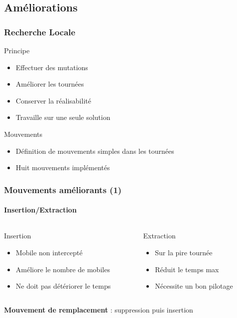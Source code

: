 \subsection{Améliorations}
\begin{frame}
	\frametitle{Recherche Locale}
	\begin{block}{Principe}
		\begin{itemize}
			\item Effectuer des mutations
			\item Améliorer les tournées
			\item Conserver la réalisabilité
			\item Travaille sur une seule solution
		\end{itemize}
	\end{block}
	\vspace*{1em}
	\begin{block}{Mouvements}
		\begin{itemize}
			\item Définition de mouvements simples dans les tournées
			\item Huit mouvements implémentés
		\end{itemize}
	\end{block}
	
\end{frame}
\begin{frame}
	\frametitle{Mouvements améliorants (1)}
	\framesubtitle{Insertion/Extraction}
	\begin{columns}
		\begin{column}{.53\linewidth}
			\begin{block}{Insertion}
				\centering
				\begin{tikzpicture}[scale=.7,schema,transform shape,thick]
					
				\end{tikzpicture}
			\end{block}
			\begin{itemize}
				\item Mobile non intercepté
				\item Améliore le nombre de mobiles
				\item Ne doit pas détériorer le temps
			\end{itemize}
		\end{column}
		\begin{column}{.53\linewidth}
			\begin{block}{Extraction}
				\centering
				\begin{tikzpicture}[scale=.7,schema,transform shape,thick]
					
				\end{tikzpicture}
			\end{block}
			\begin{itemize}
				\item Sur la pire tournée
				\item Réduit le temps max
				\item Nécessite un bon pilotage
			\end{itemize}
		\end{column}
	\end{columns}
	\vspace*{2em}
	\textbf{Mouvement de remplacement} : suppression puis insertion
\end{frame}
